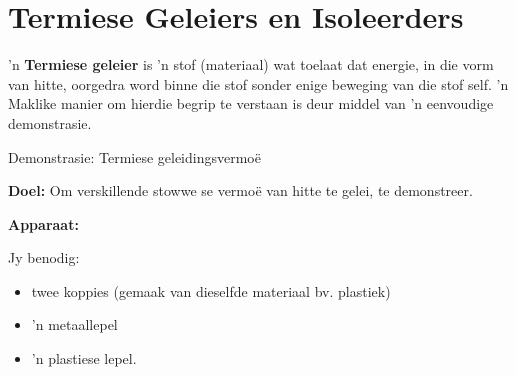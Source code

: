             \section{Termiese Geleiers en Isoleerders}
            \nopagebreak
      \label{m38706*id66527} 'n \textbf{Termiese geleier} is 'n stof (materiaal) wat toelaat dat energie, in die vorm van hitte, oorgedra word binne die stof sonder enige beweging van die stof self. 'n Maklike manier om hierdie begrip te verstaan is deur middel van 'n eenvoudige demonstrasie.\par 


\label{m38706*secfhsst!!!underscore!!!id453}
            \begin{g_experiment}{Demonstrasie: Termiese geleidingsvermo\"e}{
            \nopagebreak
            \label{m38706*id66568}\noindent{}\textbf{Doel: }\newline
      Om verskillende stowwe se vermoë van hitte te gelei, te demonstreer.\par 
      \label{m38706*id66588}\noindent{}\textbf{Apparaat: }\newline
\begin{minipage}{.5\textwidth}
Jy benodig:
\begin{itemize}
 \item twee koppies (gemaak van dieselfde materiaal bv. plastiek)
\item 'n metaallepel
\item 'n plastiese lepel.
\end{itemize} 
\end{minipage}
\begin{minipage}{.5\textwidth}
	\begin{figure}[H] %
    \begin{center}
\end{center}
\end{figure}
\end{minipage}}
\end{g_experiment}

